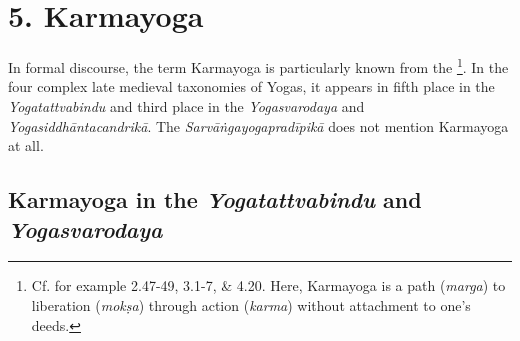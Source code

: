 \section{5. Karmayoga}
\label{karmayogaintro}

In formal discourse, the term Karmayoga is particularly known from the \footnote{Cf. for example  2.47-49, 3.1-7, \& 4.20. Here, Karmayoga is a path (\textit{marga}) to liberation (\textit{mokṣa}) through action (\textit{karma}) without attachment to one's deeds.}. In the four complex late medieval taxonomies of Yogas, it appears in fifth place in the \textit{Yogatattvabindu} and third place in the \textit{Yogasvarodaya} and \textit{Yogasiddhāntacandrikā}. The \textit{Sarvāṅgayogapradīpikā} does not mention Karmayoga at all.  

\subsection{Karmayoga in the \textit{Yogatattvabindu} and \textit{Yogasvarodaya}}

